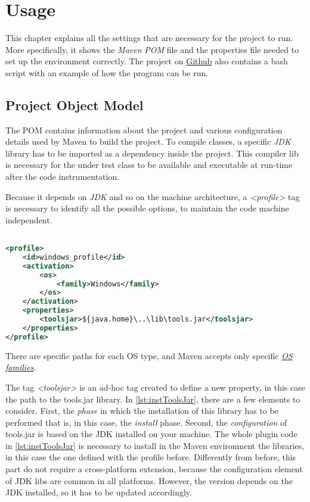 \chapter{Usage}\label{ch:usage}

This chapter explains all the settings that are necessary for the project to run. More specifically, it shows the \textit{Maven} \textit{POM} file and the properties file needed to set up the environment correctly. The project on \href{\projRoot}{Github} also contains a bash script with an example of how the program can be run.

\section{Project Object Model}\label{sec:pom}

The POM contains information about the project and various configuration details used by Maven to build the project.
To compile classes, a specific \emph{JDK} library has to be imported as a dependency inside the project.
This compiler lib is necessary for the under test class to be available and executable at run-time after the code instrumentation.

Because it depends on \emph{JDK} and so on the machine architecture, a \emph{<profile>} tag is necessary to identify all the possible options, to maintain the code machine independent.
\begin{lstlisting}[language=XML,caption={Windows default profile for jdk lib},label={lst:winToolsJar}]% Start your code-block

<profile>
	<id>windows_profile</id>
	<activation>
		<os>
			<family>Windows</family>
		</os>
	</activation>
	<properties>
		<toolsjar>${java.home}\..\lib\tools.jar</toolsjar>
	</properties>
</profile>
\end{lstlisting}

There are specific paths for each OS type, and Maven accepts only specific \href{http://maven.apache.org/enforcer/enforcer-rules/requireOS.html}{\textit{OS families}}.

The tag \textit{<toolsjar>} is an ad-hoc tag created to define a new property, in this case the path to the tools.jar library. In \autoref{lst:instToolsJar}, there are a few elements to consider. First, the \textit{phase} in which the installation of this library has to be performed that is, in this case, the \textit{install} phase. Second, the \textit{configuration} of tools.jar is based on the JDK installed on your machine. The whole plugin code in \autoref{lst:instToolsJar} is necessary to install in the Maven environment the libraries, in this case the one defined with the profile before.
Differently from before, this part do not require a cross-platform extension, because the configuration element of JDK libs are common in all platforms. However, the version depends on the JDK installed, so it has to be updated accordingly.

